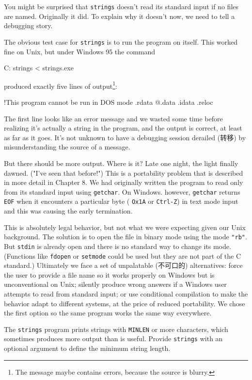 You might be surprised that \verb'strings' doesn't read its standard input
if no files are named. Originally it did. To explain why it doesn't now, we
need to tell a debugging story.

The obvious test case for \verb'strings' is to run the program on itself.
This worked fine on Unix, but under Windows 95 the command
\begin{wellcode}
    C:\> strings < strings.exe
\end{wellcode}
produced exactly five lines of output\footnote{The message maybe contains
errors, because the source is blurry.}:
\begin{wellcode}
    !This program cannot be run in DOS mode
    .rdata
    @.data
    .idata
    .reloc
\end{wellcode}
The first line looks like an error message and we wasted some time before
realizing it's actually a string in the program, and the output is correct,
at least as far as it goes.  It's not unknown to have a debugging session
derailed (转移) by misunderstanding the source of a message.

But there should be more output. Where is it? Late one night, the light
finally dawned. ("I've seen that before!") This is a portability problem
that is described in more detail in Chapter 8. We had originally written
the program to read only from its standard input using \verb'getchar'. On
Windows. however, \verb'getchar' returns \verb'EOF' when it encounters a
particular byte ( \verb'Ox1A' or \verb'Ctrl-Z') in text mode input and this
was causing the early termination.

This is absolutely legal behavior, but not what we were expecting given our
Unix background. The solution is to open the file in binary mode using the
mode \verb'"rb"'.  But \verb'stdin' is already open and there is no
standard way to change its mode. (Functions like \verb'fdopen' or
\verb'setmode' could be used but they are not part of the C standard.)
Ultimately we face a set of unpalatable (不可口的) alternatives: force the
user to provide a file name so it works properly on Windows but is
unconventional on Unix; silently produce wrong answers if a Windows user
attempts to read from standard input; or use conditional compilation to
make the behavior adapt to different systems, at the price of reduced
portability. We chose the first option so the same program works the same
way everywhere.

\begin{exercise}
    The \verb'strings' program prints strings with \verb'MINLEN' or more
    characters, which sometimes produces more output than is useful.
    Provide \verb'strings' with an optional argument to define the minimum
    string length.
\end{exercise}

